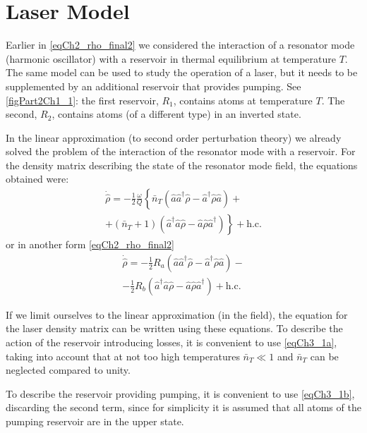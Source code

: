 \section{Laser Model}

Earlier in \eqref{eqCh2_rho_final2} we considered the interaction of a resonator mode
(harmonic oscillator) with a reservoir in thermal
equilibrium at temperature $T$. The same model can be used
to study the operation of a laser, but it needs to be supplemented by an additional
reservoir that provides pumping.  
See \autoref{figPart2Ch1_1}: the first reservoir, $R_1$, contains atoms
at temperature $T$. The second, $R_2$, contains atoms (of a different
type) in an inverted state.



In the linear approximation (to second order perturbation theory) we already solved
the problem of the interaction of the resonator mode with a reservoir.
For the density matrix describing the state of the resonator mode field, the equations obtained were:  
\begin{eqnarray}
\dot{\hat{\rho}} =
- \frac{1}{2}\frac{\omega}{Q}\left\{
\bar{n}_T\left(\hat{a}\hat{a}^{\dag}\hat{\rho} - 
\hat{a}^{\dag}\hat{\rho}\hat{a}
\right)\right.
+ 
\nonumber \\
\left.
+ \left(\bar{n}_T + 1\right)
\left(\hat{a}^{\dag}\hat{a}\hat{\rho} - 
\hat{a}\hat{\rho}\hat{a}^{\dag}
\right)
\right\}
 + \mbox{h.c.}
\label{eqCh3_1a}
\end{eqnarray}
or in another form \eqref{eqCh2_rho_final2}
\begin{eqnarray}
\dot{\hat{\rho}} =
- \frac{1}{2}R_a
\left(\hat{a}\hat{a}^{\dag}\hat{\rho} - 
\hat{a}^{\dag}\hat{\rho}\hat{a}
\right)
- 
\nonumber \\
- \frac{1}{2}R_b
\left(\hat{a}^{\dag}\hat{a}\hat{\rho} - 
\hat{a}\hat{\rho}\hat{a}^{\dag}
\right)
 + \mbox{h.c.}
\label{eqCh3_1b}
\end{eqnarray}

If we limit ourselves to the linear approximation (in the field), the equation for
the laser density matrix can be written using these equations. To
describe the action of the reservoir introducing losses, it is convenient to use
\eqref{eqCh3_1a}, taking into account that at not too high
temperatures $\bar{n}_T \ll 1$ and $\bar{n}_T$
can be neglected compared to unity.
 
To describe the reservoir providing pumping, it is convenient to use
\eqref{eqCh3_1b}, discarding the second term, since for simplicity
it is assumed that all atoms of the pumping reservoir are in the upper
state.

